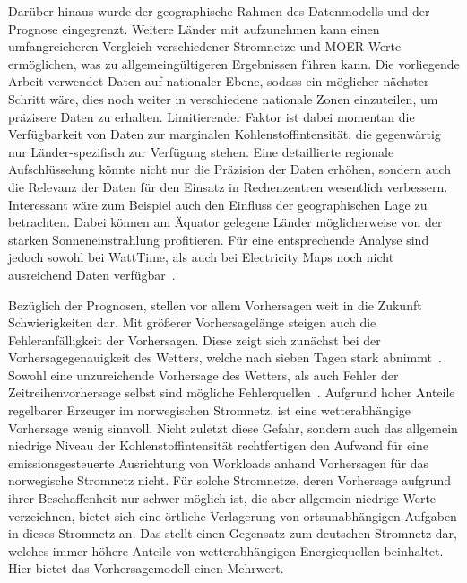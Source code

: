 Darüber hinaus wurde der geographische Rahmen des Datenmodells und der Prognose eingegrenzt.
Weitere Länder mit aufzunehmen kann einen umfangreicheren Vergleich verschiedener Stromnetze und \ac{MOER}-Werte ermöglichen, was zu allgemeingültigeren Ergebnissen führen kann.
Die vorliegende Arbeit verwendet Daten auf nationaler Ebene, sodass ein möglicher nächster Schritt wäre, dies noch weiter in verschiedene nationale Zonen einzuteilen, um präzisere Daten zu erhalten.
Limitierender Faktor ist dabei momentan die Verfügbarkeit von Daten zur marginalen Kohlenstoffintensität, die gegenwärtig nur Länder-spezifisch zur Verfügung stehen.
Eine detaillierte regionale Aufschlüsselung könnte nicht nur die Präzision der Daten erhöhen, sondern auch die Relevanz der Daten für den Einsatz in Rechenzentren wesentlich verbessern.
Interessant wäre zum Beispiel auch den Einfluss der geographischen Lage zu betrachten.
Dabei können am Äquator gelegene Länder möglicherweise von der starken Sonneneinstrahlung profitieren.
Für eine entsprechende Analyse sind jedoch sowohl bei WattTime, als auch bei Electricity Maps noch nicht ausreichend Daten verfügbar~\cite{WattTime.20230823}\cite{ElectricityMaps.20240305T20:54:29.000Z}.

Bezüglich der Prognosen, stellen vor allem Vorhersagen weit in die Zukunft Schwierigkeiten dar.
Mit größerer Vorhersagelänge steigen auch die Fehleranfälligkeit der Vorhersagen.
Diese zeigt sich zunächst bei der Vorhersagegenauigkeit des Wetters, welche nach sieben Tagen stark abnimmt~\cite{Lam.2022}.
Sowohl eine unzureichende Vorhersage des Wetters, als auch Fehler der Zeitreihenvorhersage selbst sind mögliche Fehlerquellen~\cite{Wiesner.2021}.
Aufgrund hoher Anteile regelbarer Erzeuger im norwegischen Stromnetz, ist eine wetterabhängige Vorhersage wenig sinnvoll.
Nicht zuletzt diese Gefahr, sondern auch das allgemein niedrige Niveau der Kohlenstoffintensität rechtfertigen den Aufwand für eine emissionsgesteuerte Ausrichtung von Workloads anhand Vorhersagen für das norwegische Stromnetz nicht.
Für solche Stromnetze, deren Vorhersage aufgrund ihrer Beschaffenheit nur schwer möglich ist, die aber allgemein niedrige Werte verzeichnen, bietet sich eine örtliche Verlagerung von ortsunabhängigen Aufgaben in dieses Stromnetz an.
Das stellt einen Gegensatz zum deutschen Stromnetz dar, welches immer höhere Anteile von wetterabhängigen Energiequellen beinhaltet.
Hier bietet das Vorhersagemodell einen Mehrwert.

